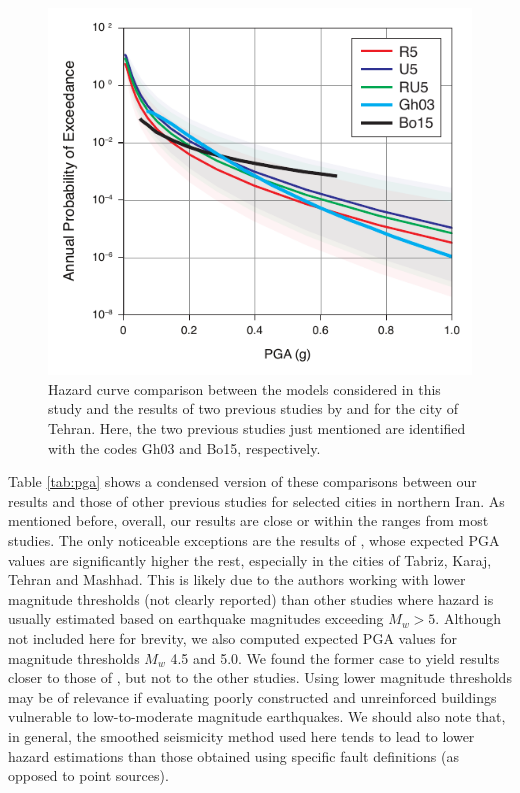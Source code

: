 \begin{figure}[t]
    \centering
    \includegraphics[width=\columnwidth]{figures/pdf/figure-12} 
    \caption{Hazard curve comparison between the models considered in this study and the results of two previous studies by \citet{Ghodrati2003} and \citet{Boostan2015} for the city of Tehran. Here, the two previous studies just mentioned are identified with the codes Gh03 and Bo15, respectively.}
    \label{fig:tehran}
\end{figure}

Table \ref{tab:pga} shows a condensed version of these comparisons between our results and those of other previous studies for selected cities in northern Iran. As mentioned before, overall, our results are close or within the ranges from most studies. The only noticeable exceptions are the results of \citet{Golara2014}, whose expected PGA values are significantly higher the rest, especially in the cities of Tabriz, Karaj, Tehran and Mashhad. This is likely due to the authors working with lower magnitude thresholds (not clearly reported) than other studies where hazard is usually estimated based on earthquake magnitudes exceeding $M_w > 5$. Although not included here for brevity, we also computed expected PGA values for magnitude thresholds $M_w$ 4.5 and 5.0. We found the former case to yield results closer to those of \citet{Golara2014}, but not to the other studies. Using lower magnitude thresholds may be of relevance if evaluating poorly constructed and unreinforced buildings vulnerable to low-to-moderate magnitude earthquakes. We should also note that, in general, the smoothed seismicity method used here tends to lead to lower hazard estimations than those obtained using specific fault definitions (as opposed to point sour\-ces).

